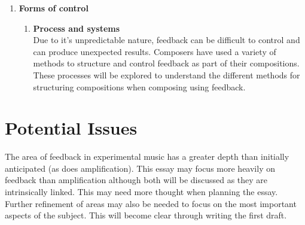 \documentclass{scrartcl}
\begin{document}
\begin{enumerate}
\begin{enumerate}[label*=\arabic*.]
        \end{enumerate}
    \item \textbf{Forms of control}
        \begin{enumerate}[label*=\arabic*.]
            \item \textbf{Process and systems}\\
                Due to it's unpredictable nature, feedback can be difficult to
                control and can produce unexpected results. Composers have used
                a variety of methods to structure and control feedback as part
                of their compositions.~\parencite{weisert2010ioi} These
                processes will be explored to understand the different methods
                for structuring compositions when composing using feedback.
        \end{enumerate}
    \end{enumerate}

    \section{Potential Issues}
    The area of feedback in experimental music has a greater depth than
    initially anticipated (as does amplification). This essay may focus more
    heavily on feedback than amplification although both will be discussed as
    they are intrinsically linked. This may need more thought when planning the
    essay.\\
    Further refinement of areas may also be needed to focus on the most
    important aspects of the subject. This will become clear through writing
    the first draft.
    \printbibliography
\end{document}
